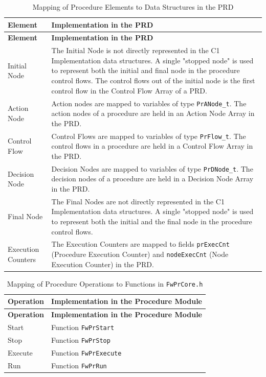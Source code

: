 \documentclass[requirements]{../fwprofile}
\begin{document}
\begin{longtable}{|p{2.7cm}|P{8.5cm}|}
\caption{Mapping of Procedure Elements to Data Structures in the PRD} 
\label{tab:PR_Elements_Implementation}\\
\hline
{}
\textbf{Element} & \textbf{Implementation in the PRD} \\
\hline
\endfirsthead
{}
\textbf{Element} & \textbf{Implementation in the PRD} \\
\hline
\endhead
Initial Node & The Initial Node is not directly represented in the C1 Implementation data structures. 
A single "stopped node" is used to represent both the initial and final node in the procedure control flows.
The control flows out of the initial node is the first control flow in the Control Flow Array of a PRD.\\
\hline
Action Node & Action nodes are mapped to variables of type \texttt{PrANode\_t}. 
The action nodes of a procedure are held in an Action Node Array in the PRD.\\
\hline
Control Flow & Control Flows are mapped to variables of type \texttt{PrFlow\_t}. 
The control flows in a procedure are held in a Control Flow Array in the PRD.\\
\hline
Decision Node & Decision Nodes are mapped to variables of type \texttt{PrDNode\_t}. 
The decision nodes of a procedure are held in a Decision Node Array in the PRD.\\
\hline
Final Node & The Final Nodes are not directly represented in the C1 Implementation data structures.
A single "stopped node" is used to represent both the initial and the final node in the procedure control flows.\\
\hline
Execution Counters & The Execution Counters are mapped to fields \texttt{prExecCnt} (Procedure Execution Counter) and
\texttt{nodeExecCnt} (Node Execution Counter) in the PRD.\\
\hline
\end{longtable}

\begin{longtable}{|p{3.7cm}|p{7.5cm}|}
\caption{Mapping of Procedure Operations to Functions in \texttt{FwPrCore.h}} 
\label{tab:PR_Operations_Implementation}\\
\hline
\rowcolor{gray}
\textbf{Operation} & \textbf{Implementation in the Procedure Module} \\
\hline
\endfirsthead
\rowcolor{gray}
\textbf{Operation} & \textbf{Implementation in the Procedure Module} \\
\hline
\endhead
Start & Function \texttt{FwPrStart} \\
\hline
Stop  & Function \texttt{FwPrStop} \\
\hline
Execute & Function \texttt{FwPrExecute} \\
\hline
Run & Function \texttt{FwPrRun} \\
\hline
\end{longtable}
\end{document}
